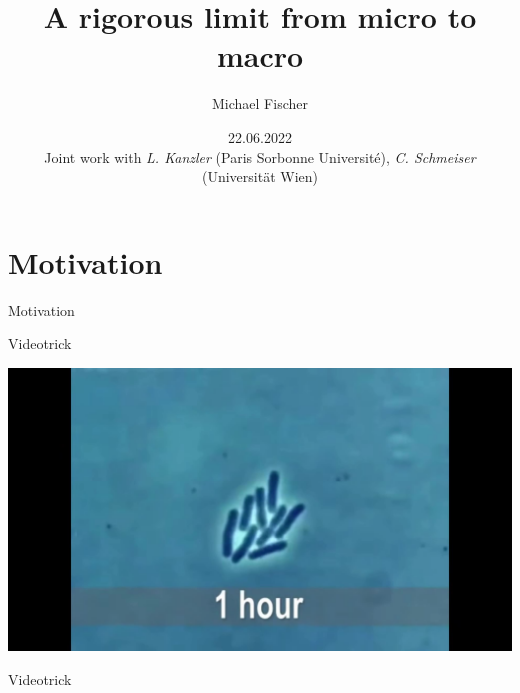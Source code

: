 \documentclass[xcolor=dvipsnames, aspectratio=169]{beamer}
\title{A rigorous limit from micro to macro}
\author{Michael Fischer}
\institute{University of Vienna}
\date{22.06.2022 \\ \vspace{0.2in} \footnotesize{Joint work with \textit{L. Kanzler} (Paris Sorbonne Université), \textit{C. Schmeiser} (Universität Wien)}}
\begin{document}

\begin{frame}[t]
	\titlepage
\end{frame}

\logo{}




\section{Motivation}

\begin{frame}[t]{Motivation}

\end{frame}

\begin{frame}[t]{Videotrick}
\begin{center}
\includegraphics[width=0.6\linewidth]{bacteria_pushing/bacteria-pushing-01.jpeg} 
\end{center}
\end{frame}

\begin{frame}[t]{Videotrick}
\begin{center}
\end{center}
\end{frame}
\end{document}
